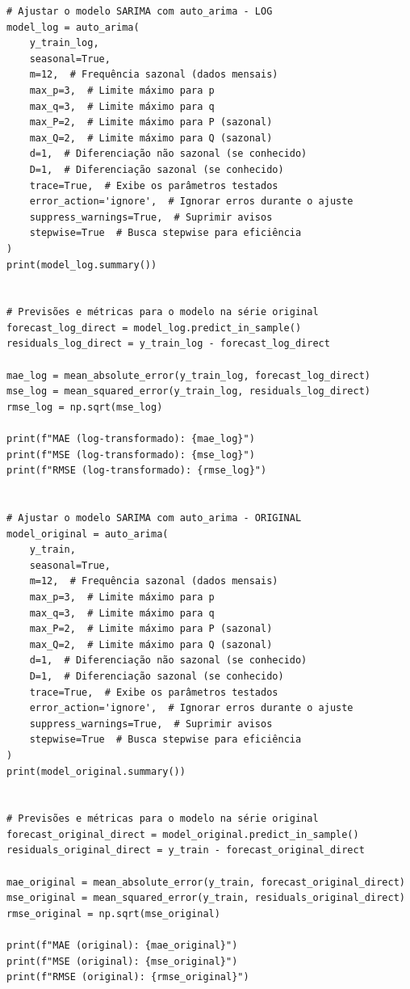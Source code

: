 \documentclass[a4paper, 12pt]{article}
\begin{document}
\begin{lstlisting}[style=python]
# Ajustar o modelo SARIMA com auto_arima - LOG
model_log = auto_arima(
    y_train_log,
    seasonal=True,
    m=12,  # Frequência sazonal (dados mensais)
    max_p=3,  # Limite máximo para p
    max_q=3,  # Limite máximo para q
    max_P=2,  # Limite máximo para P (sazonal)
    max_Q=2,  # Limite máximo para Q (sazonal)
    d=1,  # Diferenciação não sazonal (se conhecido)
    D=1,  # Diferenciação sazonal (se conhecido)
    trace=True,  # Exibe os parâmetros testados
    error_action='ignore',  # Ignorar erros durante o ajuste
    suppress_warnings=True,  # Suprimir avisos
    stepwise=True  # Busca stepwise para eficiência
)
print(model_log.summary())


# Previsões e métricas para o modelo na série original
forecast_log_direct = model_log.predict_in_sample()
residuals_log_direct = y_train_log - forecast_log_direct

mae_log = mean_absolute_error(y_train_log, forecast_log_direct)
mse_log = mean_squared_error(y_train_log, residuals_log_direct)
rmse_log = np.sqrt(mse_log)

print(f"MAE (log-transformado): {mae_log}")
print(f"MSE (log-transformado): {mse_log}")
print(f"RMSE (log-transformado): {rmse_log}")


# Ajustar o modelo SARIMA com auto_arima - ORIGINAL
model_original = auto_arima(
    y_train,
    seasonal=True,
    m=12,  # Frequência sazonal (dados mensais)
    max_p=3,  # Limite máximo para p
    max_q=3,  # Limite máximo para q
    max_P=2,  # Limite máximo para P (sazonal)
    max_Q=2,  # Limite máximo para Q (sazonal)
    d=1,  # Diferenciação não sazonal (se conhecido)
    D=1,  # Diferenciação sazonal (se conhecido)
    trace=True,  # Exibe os parâmetros testados
    error_action='ignore',  # Ignorar erros durante o ajuste
    suppress_warnings=True,  # Suprimir avisos
    stepwise=True  # Busca stepwise para eficiência
)
print(model_original.summary())


# Previsões e métricas para o modelo na série original
forecast_original_direct = model_original.predict_in_sample()
residuals_original_direct = y_train - forecast_original_direct

mae_original = mean_absolute_error(y_train, forecast_original_direct)
mse_original = mean_squared_error(y_train, residuals_original_direct)
rmse_original = np.sqrt(mse_original)

print(f"MAE (original): {mae_original}")
print(f"MSE (original): {mse_original}")
print(f"RMSE (original): {rmse_original}")
\end{lstlisting}
\end{document}
